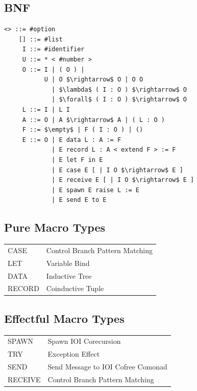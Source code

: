 \documentclass[11pt,oneside]{article}
\begin{document}
   \subsection{BNF}

\begin{lstlisting}[mathescape=true]
    <> ::= #option
    [] ::= #list
     I ::= #identifier
     U ::= * < #number >
     O ::= I | ( O ) |
           U | O $\rightarrow$ O | O O
             | $\lambda$ ( I : O ) $\rightarrow$ O
             | $\forall$ ( I : O ) $\rightarrow$ O
     L ::= I | L I
     A ::= O | A $\rightarrow$ A | ( L : O )
     F ::= $\empty$ | F ( I : O ) | ()
     E ::= O | E data L : A := F
             | E record L : A < extend F > := F
             | E let F in E
             | E case E [ | I O $\rightarrow$ E ]
             | E receive E [ | I O $\rightarrow$ E ]
             | E spawn E raise L := E
             | E send E to E
\end{lstlisting}

\newpage

   \subsection{Pure Macro Types}

   \begin{center}
   \begin{tabular}{ll}
   CASE   & Control Branch Pattern Matching\\
   LET    & Variable Bind\\
   DATA   & Inductive Tree\\
   RECORD & Coinductive Tuple\\
   \end{tabular}
   \end{center}

   \subsection{Effectful Macro Types}

   \begin{center}
   \begin{tabular}{ll}
   SPAWN   & Spawn IOI Corecursion\\
   TRY     & Exception Effect\\
   SEND    & Send Message to IOI Cofree Comonad\\
   RECEIVE & Control Branch Pattern Matching\\
   \end{tabular}
   \end{center}
\end{document}
